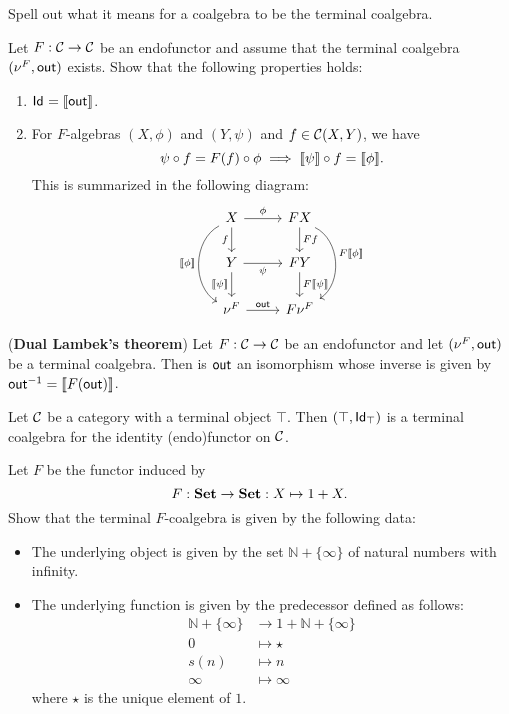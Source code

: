 \begin{exer} Spell out what it means for a coalgebra to be the terminal coalgebra.
\end{exer}

\begin{exer} Let $F:\CC\to\CC$ be an endofunctor and assume that the terminal coalgebra $(\Terminalcoalg{F}, \Out)$ exists. Show that the following properties holds:
\begin{enumerate}
\item $\Id = \anam{\Out}$.
\item For $F$-algebras $(X,\phi)$ and $(Y,\psi)$ and $f\in\CHom{\CC}{X}{Y}$, we have 
\[
  \co f \psi   = \co \phi {F(f)} \implies \co{f}{\anam{\psi}} = \anam{\phi}.
\]
This is summarized in the following diagram:
\[
\begin{tikzcd}
X
\arrow[r, "\phi"] 
\arrow[d,swap, "f"]
\ar[dd, "\anam{\phi}"', bend right = 60]
&
FX
\arrow[d, "Ff"]
\ar[dd, "F\anam{\phi}", bend left = 60]
\\
Y
\arrow[r, swap, "\psi"]
\ar[d, "\anam{\psi}"']
&
FY
\ar[d, "F\anam{\psi}"]
\\
\Terminalcoalg{F}
\ar[r, "\Out"]
&
F\Terminalcoalg{F}
\end{tikzcd}
\]
\end{enumerate} 
\end{exer}

\begin{exer} (\textbf{Dual Lambek's theorem}) Let $F:\CC\to\CC$ be an endofunctor and let $(\Terminalcoalg{F}, \Out)$ be a terminal coalgebra. Then is $\Out$ an isomorphism whose inverse is given by $\Inv{\Out} = \anam{F(\Out)}$.
\end{exer}

\begin{exer}\label{exer:terminalalg_for_idfun_with_terminalob} Let $\CC$ be a category with a terminal object $\top$. Then $(\top, \Id[\top])$ is a terminal coalgebra for the identity (endo)functor on $\CC$.
\end{exer}

\begin{exer} \label{exer:conatural_numbers_terminal_coalgebra} Let $F$ be the functor induced by 
\[
F:\SET\to\SET : X\mapsto 1 + X.
\]
Show that the terminal $F$-coalgebra is given by the following data:
\begin{itemize}
\item The underlying object is given by the set $\mathbb{N} + \{\infty\}$ of natural numbers with infinity.
\item The underlying function is given by the predecessor defined as follows: 
\begin{align*}
  \mathbb{N} + \{\infty\} &\to 1 + \mathbb{N} + \{\infty\}
  \\
  0 &\mapsto \star
  \\
  s(n) &\mapsto n
  \\
  \infty &\mapsto \infty
\end{align*}
where $\star$ is the unique element of $1$.
\end{itemize}
\end{exer}


